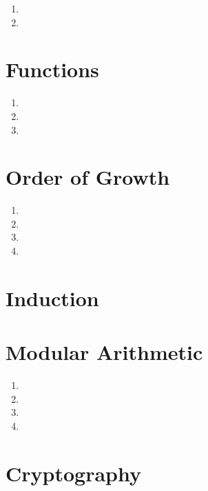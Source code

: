 \documentclass[11pt]{article}
\begin{document}
\begin{enumerate}[label=\alph*)]
\item 
\item 
\end{enumerate}




\section{Functions}


\begin{enumerate}[label=\alph*)]
\item 
\item
\item 
\end{enumerate}

\section{Order of Growth}


\begin{enumerate}[label=\alph*)]
\item
\item 
\item 
\item 
\end{enumerate}

\section{Induction}



\section{Modular Arithmetic}

\begin{enumerate}[label=\alph*)]
\item 
\item 
\item 
\item 
\end{enumerate}

\section{Cryptography}
\end{document}
